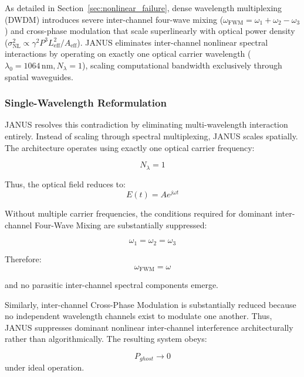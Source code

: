 \documentclass[journal]{IEEEtran}
\begin{document}
As detailed in Section~\ref{sec:nonlinear_failure}, dense wavelength multiplexing (DWDM) introduces severe inter-channel four-wave mixing ($\omega_{\mathrm{FWM}} = \omega_1 + \omega_2 - \omega_3$) and cross-phase modulation that scale superlinearly with optical power density ($\sigma_{\mathrm{NL}}^2 \propto \gamma^2 P^3 L_{\mathrm{eff}}^2 / A_{\mathrm{eff}}$). JANUS eliminates inter-channel nonlinear spectral interactions by operating on exactly one optical carrier wavelength ($\lambda_0 = 1064\,\mathrm{nm}, N_\lambda = 1$), scaling computational bandwidth exclusively through spatial waveguides.

\subsubsection{\textbf{Single-Wavelength Reformulation}}

JANUS resolves this contradiction by eliminating multi-wavelength interaction entirely. Instead of scaling through spectral multiplexing, JANUS scales spatially. The architecture operates using exactly one optical carrier frequency:

\begin{equation}
N_{\lambda} = 1
\end{equation}

Thus, the optical field reduces to:
\begin{equation}
E(t) = Ae^{j\omega t}
\end{equation}

Without multiple carrier frequencies, the conditions required for dominant inter-channel Four-Wave Mixing are substantially suppressed:

\begin{equation}
\omega_1 = \omega_2 = \omega_3
\end{equation}

Therefore:
\begin{equation}
\omega_{\text{FWM}} =  \omega
\end{equation}

and no parasitic inter-channel spectral components emerge. 

Similarly, inter-channel Cross-Phase Modulation is substantially reduced because no independent wavelength channels exist to modulate one another. Thus, JANUS suppresses dominant nonlinear inter-channel interference architecturally rather than algorithmically. The resulting system obeys:

\begin{equation}
P_{ghost} \rightarrow 0
\end{equation}
under ideal operation.
\end{document}
